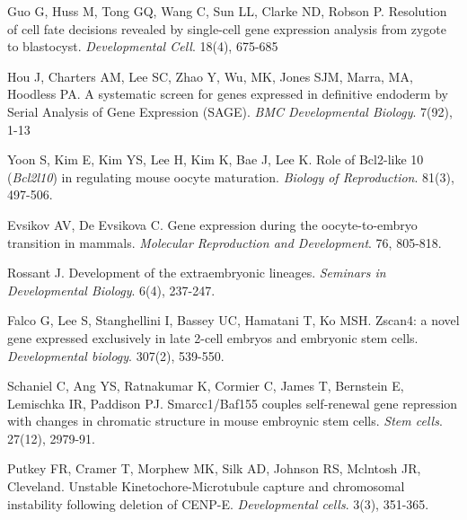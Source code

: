 \documentclass[10pt,letterpaper]{article}
\begin{document}
\begin{thebibliography}{9}
Guo G, Huss M, Tong GQ, Wang C, Sun LL, Clarke ND, Robson P.
Resolution of cell fate decisions revealed by single-cell gene expression analysis from zygote to blastocyst. \textit{Developmental Cell}. 18(4), 675-685

Hou J, Charters AM, Lee SC, Zhao Y, Wu, MK, Jones SJM, Marra, MA, Hoodless PA.
A systematic screen for genes expressed in definitive endoderm by Serial Analysis of Gene Expression (SAGE).
\textit{BMC Developmental Biology}. 7(92), 1-13


Yoon S, Kim E, Kim YS, Lee H, Kim K, Bae J, Lee K.
Role of Bcl2-like 10 (\textit{Bcl2l10}) in regulating mouse oocyte maturation.
\textit{Biology of Reproduction}. 81(3), 497-506.

Evsikov AV, De Evsikova C.
Gene expression during the oocyte-to-embryo transition in mammals.
\textit{Molecular Reproduction and Development}. 76, 805-818.

Rossant J.
Development of the extraembryonic lineages.
\textit{Seminars in Developmental Biology}. 6(4), 237-247.

Falco G, Lee S, Stanghellini I, Bassey UC, Hamatani T, Ko MSH.
Zscan4: a novel gene expressed exclusively in late 2-cell embryos and embryonic stem cells.
\textit{Developmental biology}. 307(2), 539-550.

Schaniel C, Ang YS, Ratnakumar K, Cormier C, James T, Bernstein E, Lemischka IR, Paddison PJ.
Smarcc1/Baf155 couples self-renewal gene repression with changes in chromatic structure in mouse embroynic stem cells.
\textit{Stem cells}. 27(12), 2979-91.

Putkey FR, Cramer T, Morphew MK, Silk AD, Johnson RS, Mclntosh JR, Cleveland.
Unstable Kinetochore-Microtubule capture and chromosomal instability following deletion of CENP-E.
\textit{Developmental cells}. 3(3), 351-365.

\end{thebibliography}
\end{document}
